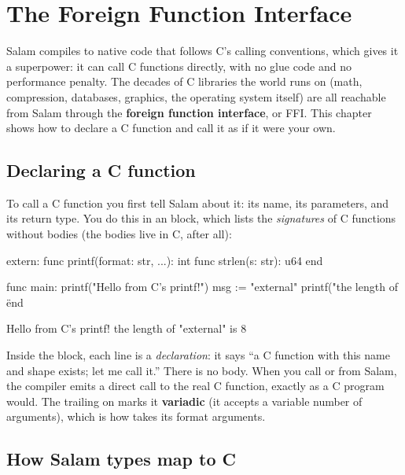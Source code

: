 \chapter{The Foreign Function Interface}%
\label{ch:ffi}

Salam compiles to native code that follows C's calling conventions, which gives it
a superpower: it can call C functions directly, with no glue code and no performance penalty. The decades of C
libraries the world runs on (math, compression, databases, graphics, the
operating system itself) are all reachable from Salam through the
\textbf{foreign function interface}, or FFI. This chapter shows how to declare a C
function and call it as if it were your own.

\section{Declaring a C function}

To call a C function you first tell Salam about it: its name, its parameters, and
its return type. You do this in an  block, which lists the
\emph{signatures} of C functions without bodies (the bodies live in C,
after all):

\begin{salamen}
extern:
    func printf(format: str, ...): int
    func strlen(s: str): u64
end

func main:
    printf("Hello from C's printf!\n")
    msg := "external"
    printf("the length of \"%
end
\end{salamen}

\begin{progout}
Hello from C's printf!
the length of "external" is 8
\end{progout}

Inside the  block, each  line is a \emph{declaration}:
it says ``a C function with this name and shape exists; let me call it.'' There is
no body. When you call  or  from Salam, the compiler
emits a direct call to the real C function, exactly as a C program would. The
trailing  on  marks it \textbf{variadic} (it accepts a
variable number of arguments), which is how  takes its format
arguments.

\section{How Salam types map to C}


